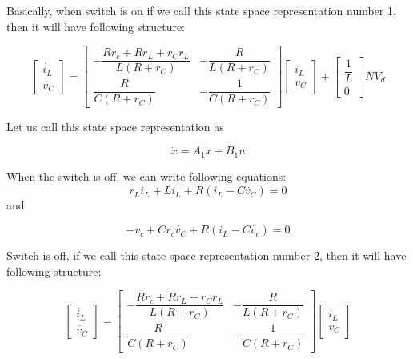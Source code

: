Basically, when switch is on if we call this state space representation number 1, then it will have following structure:

\begin{equation}
\begin{bmatrix}
\Dot{i_L} \\ \Dot{v_C}
\end{bmatrix}
=
\begin{bmatrix}
 -\dfrac{Rr_c + Rr_L + r_C r_L}{L(R + r_C)} & -\dfrac{R}{L(R + r_C)} \\
 \dfrac{R}{C(R + r_C)} & -\dfrac{1}{C(R + r_C)} 
\end{bmatrix}
\begin{bmatrix}
i_L \\ v_C
\end{bmatrix}
+
\begin{bmatrix}
\dfrac{1}{L} \\ 0
\end{bmatrix}
NV_d
\end{equation}

Let us call this state space representation as

$$ \Dot{x} = A_1 x + B_1 u$$

When the switch is off, we can write following equations:
\begin{equation}
  r_L i_L + L \Dot{i_L} + R(i_L - C\Dot{v_C}) = 0  
\end{equation}
and

\begin{equation}
    -v_c + C r_c \Dot{v_C} + R(i_L - C\Dot{v_c}) = 0
\end{equation}

Switch is off, if we call this state space representation number 2, then it will have following structure:

\begin{equation}
\begin{bmatrix}
\Dot{i_L} \\ \Dot{v_C}
\end{bmatrix}
=
\begin{bmatrix}
 -\dfrac{Rr_c + Rr_L + r_C r_L}{L(R + r_C)} & -\dfrac{R}{L(R + r_C)} \\
 \dfrac{R}{C(R + r_C)} & -\dfrac{1}{C(R + r_C)} 
\end{bmatrix}
\begin{bmatrix}
i_L \\ v_C
\end{bmatrix}
\end{equation}

